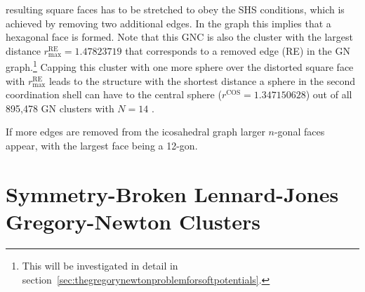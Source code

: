 resulting square faces has to be stretched to obey the SHS conditions, which is
achieved by removing two additional edges. In the graph this implies that a
hexagonal face is formed. Note that this \ac{GNC} is also the cluster with the
largest distance $r_\mathrm{max}^\mathrm{RE}= 1.47823719$ that corresponds to a
removed edge (RE) in the \ac{GN} graph.\footnote{This will be investigated in
detail in section~\ref{sec:thegregorynewtonproblemforsoftpotentials}.} Capping
this cluster with one more sphere over the distorted square face with
$r_\mathrm{max}^\mathrm{RE}$ leads to the structure with the shortest distance a
sphere in the second coordination shell can have to the central sphere
($r^\mathrm{COS}=1.347150628$) out of all 895,478 \ac{GN} clusters with $N=14$
\autocite{Trombach_stickyhardsphereLennardJonestypeclusters_2018}.

If more edges are removed from the icosahedral graph larger $n$-gonal faces
appear, with the largest face being a 12-gon.
%

\section{Symmetry-Broken Lennard-Jones Gregory-Newton Clusters}

